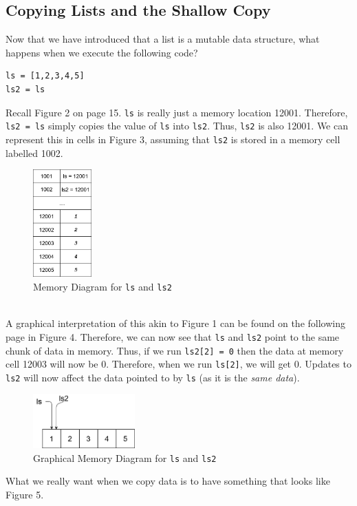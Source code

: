 \documentclass{article}
\begin{document}
\subsection{Copying Lists and the Shallow Copy}
Now that we have introduced that a list is a mutable data structure, what happens when we execute the following code?
\begin{verbatim}
ls = [1,2,3,4,5]
ls2 = ls
\end{verbatim}
Recall Figure 2 on page 15. \texttt{ls} is really just a memory location 12001. Therefore, \texttt{ls2 = ls} simply copies the value of \texttt{ls} into \texttt{ls2}. Thus, \texttt{ls2} is also 12001. We can represent this in cells in Figure 3, assuming that \texttt{ls2} is stored in a memory cell labelled 1002.
\begin{figure}[hbt]
    \centering
    \includegraphics[width=0.2\textwidth]{pointer_diagram_3.png}
    \caption{Memory Diagram for \texttt{ls} and \texttt{ls2}}
    \label{fig:my_label}
\end{figure}\\
A graphical interpretation of this akin to Figure 1 can be found on the following page in Figure 4. Therefore, we can now see that \texttt{ls} and \texttt{ls2} point to the same chunk of data in memory. Thus, if we run \texttt{ls2[2] = 0} then the data at memory cell 12003 will now be 0. Therefore, when we run \texttt{ls[2]}, we will get 0. Updates to \texttt{ls2} will now affect the data pointed to by \texttt{ls} (as it is the \textit{same data}).

\begin{figure}[hbt]
    \centering
    \includegraphics[width=0.35\textwidth]{pointer_diagram_4.png}
    \caption{Graphical Memory Diagram for \texttt{ls} and \texttt{ls2}}
    \label{fig:my_label}
\end{figure}
\noindent What we really want when we copy data is to have something that looks like Figure 5.
\end{document}
